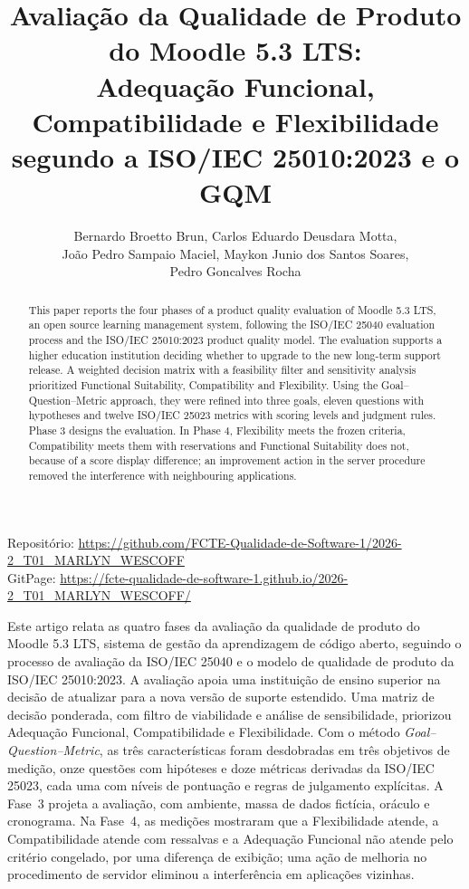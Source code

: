 \documentclass[12pt]{article}
\title{Avaliação da Qualidade de Produto do Moodle 5.3 LTS:\\
Adequação Funcional, Compatibilidade e Flexibilidade\\
segundo a ISO/IEC 25010:2023 e o GQM}
\author{Bernardo Broetto Brun, Carlos Eduardo Deusdara Motta,\\
João Pedro Sampaio Maciel, Maykon Junio dos Santos Soares,\\
Pedro Goncalves Rocha}
\begin{document}
\maketitle

\begin{center}\footnotesize
Repositório: \url{https://github.com/FCTE-Qualidade-de-Software-1/2026-2_T01_MARLYN_WESCOFF}\\
GitPage: \url{https://fcte-qualidade-de-software-1.github.io/2026-2_T01_MARLYN_WESCOFF/}
\end{center}

\begin{abstract}
This paper reports the four phases of a product quality evaluation of Moodle 5.3 LTS, an open source learning management system, following the ISO/IEC 25040 evaluation process and the ISO/IEC 25010:2023 product quality model. The evaluation supports a higher education institution deciding whether to upgrade to the new long-term support release. A weighted decision matrix with a feasibility filter and sensitivity analysis prioritized Functional Suitability, Compatibility and Flexibility. Using the Goal--Question--Metric approach, they were refined into three goals, eleven questions with hypotheses and twelve ISO/IEC 25023 metrics with scoring levels and judgment rules. Phase 3 designs the evaluation. In Phase 4, Flexibility meets the frozen criteria, Compatibility meets them with reservations and Functional Suitability does not, because of a score display difference; an improvement action in the server procedure removed the interference with neighbouring applications.
\end{abstract}

\begin{resumo}
Este artigo relata as quatro fases da avaliação da qualidade de produto do Moodle 5.3 LTS, sistema de gestão da aprendizagem de código aberto, seguindo o processo de avaliação da ISO/IEC 25040 e o modelo de qualidade de produto da ISO/IEC 25010:2023. A avaliação apoia uma instituição de ensino superior na decisão de atualizar para a nova versão de suporte estendido. Uma matriz de decisão ponderada, com filtro de viabilidade e análise de sensibilidade, priorizou Adequação Funcional, Compatibilidade e Flexibilidade. Com o método \textit{Goal--Question--Metric}, as três características foram desdobradas em três objetivos de medição, onze questões com hipóteses e doze métricas derivadas da ISO/IEC 25023, cada uma com níveis de pontuação e regras de julgamento explícitas. A Fase~3 projeta a avaliação, com ambiente, massa de dados fictícia, oráculo e cronograma. Na Fase~4, as medições mostraram que a Flexibilidade atende, a Compatibilidade atende com ressalvas e a Adequação Funcional não atende pelo critério congelado, por uma diferença de exibição; uma ação de melhoria no procedimento de servidor eliminou a interferência em aplicações vizinhas.
\end{resumo}
\end{document}
